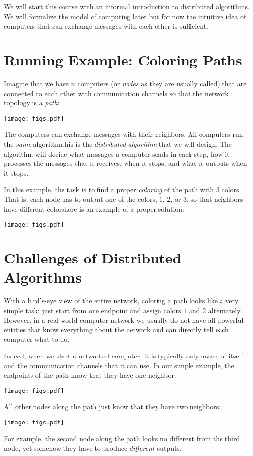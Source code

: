 

\noindent
We will start this course with an informal introduction to distributed algorithms. We will formalize the model of computing later but for now the intuitive idea of computers that can exchange messages with each other is sufficient.

\section{Running Example: Coloring Paths}

Imagine that we have $n$ computers (or \emph{nodes} as they are usually called) that are connected to each other with communication channels so that the network topology is a \emph{path}:
\begin{center}
    \texttt{[image: figs.pdf]}
\end{center}
The computers can exchange messages with their neighbors. All computers run the \emph{same} algorithm\mydash this is the \emph{distributed algorithm} that we will design. The algorithm will decide what messages a computer sends in each step, how it processes the messages that it receives, when it stops, and what it outputs when it stops.

In this example, the task is to find a proper \emph{coloring} of the path with $3$ colors. That is, each node has to output one of the colors, $1$, $2$, or $3$, so that neighbors have different colors\mydash here is an example of a proper solution:
\begin{center}
    \texttt{[image: figs.pdf]}
\end{center}

\section{Challenges of Distributed Algorithms}\label{sec:intro-challenges}

With a bird's-eye view of the entire network, coloring a path looks like a very simple task: just start from one endpoint and assign colors $1$ and $2$ alternately. However, in a real-world computer network we usually do not have all-powerful entities that know everything about the network and can directly tell each computer what to do.

Indeed, when we start a networked computer, it is typically only aware of itself and the communication channels that it can use. In our simple example, the endpoints of the path know that they have one neighbor:
\begin{center}
    \texttt{[image: figs.pdf]}
\end{center}
All other nodes along the path just know that they have two neighbors:
\begin{center}
    \texttt{[image: figs.pdf]}
\end{center}
For example, the second node along the path looks no different from the third node, yet somehow they have to produce \emph{different} outputs.

